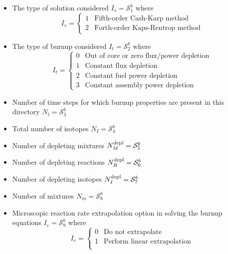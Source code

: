 \begin{itemize}
\item The type of solution considered $I_{s}=\mathcal{S}^{b}_{1}$ where
\vskip -0.8cm
\begin{displaymath}
I_{s} = \left\{
\begin{array}{rl}
 1 & \textrm{Fifth-order Cash-Karp method}\\
 2 & \textrm{Forth-order Kaps-Rentrop method}  
\end{array} \right.
\end{displaymath}

\item The type of burnup considered $I_{t}=\mathcal{S}^{b}_{2}$ where
\vskip -0.8cm
\begin{displaymath}
I_{t} = \left\{
\begin{array}{rl}
 0 & \textrm{Out of core or zero flux/power depletion} \\
 1 & \textrm{Constant flux depletion} \\
 2 & \textrm{Constant fuel power depletion} \\
 3 & \textrm{Constant assembly power depletion} 
\end{array} \right.
\end{displaymath}

\item Number of time steps for which burnup properties are present in this directory
$N_{t}=\mathcal{S}^{b}_{3}$
 
\item Total number of isotopes $N_{I}=\mathcal{S}^{b}_{4}$ 

\item Number of depleting mixtures $N^{\rm depl}_{M}=\mathcal{S}^{b}_{5}$

\item Number of depleting reactions $N^{\rm depl}_{R}=\mathcal{S}^{b}_{6}$

\item Number of depleting isotopes $N^{\rm depl}_{I}=\mathcal{S}^{b}_{7}$

\item Number of mixtures $N_m=\mathcal{S}^{b}_{8}$

\item Microscopic reaction rate extrapolation option in solving the burnup equations
$I_{e}=\mathcal{S}^{b}_{9}$ where
\vskip -0.8cm
\begin{displaymath}
I_{e} = \left\{
\begin{array}{rl}
 0 & \textrm{Do not extrapolate} \\
 1 & \textrm{Perform linear extrapolation} \\
\end{array} \right.
\end{displaymath}


\end{itemize}
